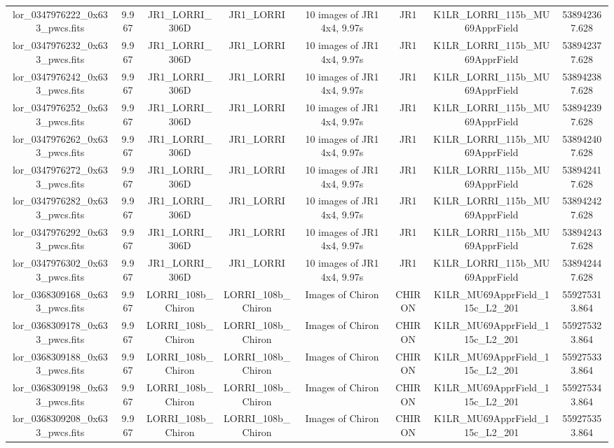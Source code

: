\begin{table}
\begin{tabular}{cccccccc}
lor_0347976222_0x633_pwcs.fits & 9.967 & JR1_LORRI_306D & JR1_LORRI & 10 images of JR1 4x4, 9.97s & JR1 & K1LR_LORRI_115b_MU69ApprField & 538942367.628 \\
lor_0347976232_0x633_pwcs.fits & 9.967 & JR1_LORRI_306D & JR1_LORRI & 10 images of JR1 4x4, 9.97s & JR1 & K1LR_LORRI_115b_MU69ApprField & 538942377.628 \\
lor_0347976242_0x633_pwcs.fits & 9.967 & JR1_LORRI_306D & JR1_LORRI & 10 images of JR1 4x4, 9.97s & JR1 & K1LR_LORRI_115b_MU69ApprField & 538942387.628 \\
lor_0347976252_0x633_pwcs.fits & 9.967 & JR1_LORRI_306D & JR1_LORRI & 10 images of JR1 4x4, 9.97s & JR1 & K1LR_LORRI_115b_MU69ApprField & 538942397.628 \\
lor_0347976262_0x633_pwcs.fits & 9.967 & JR1_LORRI_306D & JR1_LORRI & 10 images of JR1 4x4, 9.97s & JR1 & K1LR_LORRI_115b_MU69ApprField & 538942407.628 \\
lor_0347976272_0x633_pwcs.fits & 9.967 & JR1_LORRI_306D & JR1_LORRI & 10 images of JR1 4x4, 9.97s & JR1 & K1LR_LORRI_115b_MU69ApprField & 538942417.628 \\
lor_0347976282_0x633_pwcs.fits & 9.967 & JR1_LORRI_306D & JR1_LORRI & 10 images of JR1 4x4, 9.97s & JR1 & K1LR_LORRI_115b_MU69ApprField & 538942427.628 \\
lor_0347976292_0x633_pwcs.fits & 9.967 & JR1_LORRI_306D & JR1_LORRI & 10 images of JR1 4x4, 9.97s & JR1 & K1LR_LORRI_115b_MU69ApprField & 538942437.628 \\
lor_0347976302_0x633_pwcs.fits & 9.967 & JR1_LORRI_306D & JR1_LORRI & 10 images of JR1 4x4, 9.97s & JR1 & K1LR_LORRI_115b_MU69ApprField & 538942447.628 \\
lor_0368309168_0x633_pwcs.fits & 9.967 & LORRI_108b_Chiron & LORRI_108b_Chiron & Images of Chiron & CHIRON & K1LR_MU69ApprField_115c_L2_201 & 559275313.864 \\
lor_0368309178_0x633_pwcs.fits & 9.967 & LORRI_108b_Chiron & LORRI_108b_Chiron & Images of Chiron & CHIRON & K1LR_MU69ApprField_115c_L2_201 & 559275323.864 \\
lor_0368309188_0x633_pwcs.fits & 9.967 & LORRI_108b_Chiron & LORRI_108b_Chiron & Images of Chiron & CHIRON & K1LR_MU69ApprField_115c_L2_201 & 559275333.864 \\
lor_0368309198_0x633_pwcs.fits & 9.967 & LORRI_108b_Chiron & LORRI_108b_Chiron & Images of Chiron & CHIRON & K1LR_MU69ApprField_115c_L2_201 & 559275343.864 \\
lor_0368309208_0x633_pwcs.fits & 9.967 & LORRI_108b_Chiron & LORRI_108b_Chiron & Images of Chiron & CHIRON & K1LR_MU69ApprField_115c_L2_201 & 559275353.864 \\

\end{tabular}
\end{table}
